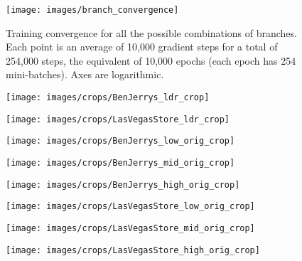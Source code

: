 \documentclass{egpubl}
\newcommand{\tc}[1]{{#1}}
\begin{document}
\begin{figure}[htb]
    \centering
    \texttt{[image: images/branch\_convergence]}
    \caption{\tc{Training convergence for all the possible combinations of
    branches. Each point is an average of 10,000 gradient steps for a total of
    254,000 steps, the equivalent of 10,000 epochs (each epoch has 254
    mini-batches). Axes are logarithmic.}}\label{fig:branch_conv}
\end{figure}


\begin{figure*}[htb]
    \centering
    \begin{subfigure}[t]{0.40\linewidth}
        \centering
        \texttt{[image: images/crops/BenJerrys\_ldr\_crop]}
    \end{subfigure}
    \begin{subfigure}[t]{0.40\linewidth}
        \centering
        \texttt{[image: images/crops/LasVegasStore\_ldr\_crop]}
    \end{subfigure}

    \begin{subfigure}[t]{0.13\linewidth}
        \centering
        \texttt{[image: images/crops/BenJerrys\_low\_orig\_crop]}
    \end{subfigure}
    \begin{subfigure}[t]{0.13\linewidth}
        \centering
        \texttt{[image: images/crops/BenJerrys\_mid\_orig\_crop]}
    \end{subfigure}
    \begin{subfigure}[t]{0.13\linewidth}
        \centering
        \texttt{[image: images/crops/BenJerrys\_high\_orig\_crop]}
    \end{subfigure}
    \begin{subfigure}[t]{0.13\linewidth}
        \centering
        \texttt{[image: images/crops/LasVegasStore\_low\_orig\_crop]}
    \end{subfigure}
    \begin{subfigure}[t]{0.13\linewidth}
        \centering
        \texttt{[image: images/crops/LasVegasStore\_mid\_orig\_crop]}
    \end{subfigure}
    \begin{subfigure}[t]{0.13\linewidth}
        \centering
        \texttt{[image: images/crops/LasVegasStore\_high\_orig\_crop]}
    \end{subfigure}


\end{figure*}
\end{document}
